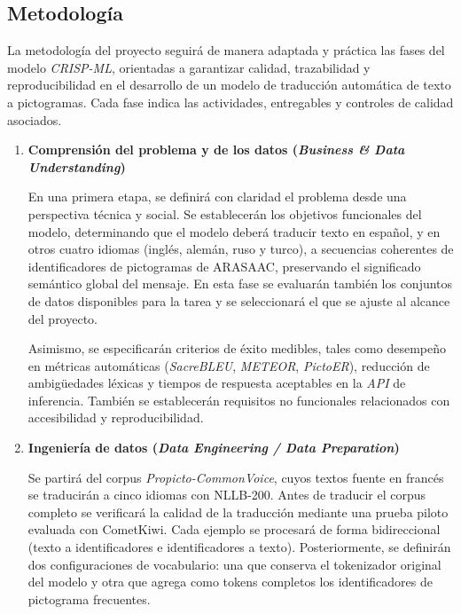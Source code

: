 \subsection{Metodología}

La metodología del proyecto seguirá de manera adaptada y práctica las fases del modelo \textit{CRISP-ML}, orientadas a garantizar calidad, trazabilidad y reproducibilidad en el desarrollo de un modelo de traducción automática de texto a pictogramas. Cada fase indica las actividades, entregables y controles de calidad asociados.

\begin{enumerate}

    \item \textbf{Comprensión del problema y de los datos (\textit{Business \& Data Understanding})}

    En una primera etapa, se definirá con claridad el problema desde una perspectiva técnica y social. Se establecerán los objetivos funcionales del modelo, determinando que el modelo deberá traducir texto en español, y en otros cuatro idiomas (inglés, alemán, ruso y turco), a secuencias coherentes de identificadores de pictogramas de ARASAAC, preservando el significado semántico global del mensaje. En esta fase se evaluarán también los conjuntos de datos disponibles para la tarea y se seleccionará el que se ajuste al alcance del proyecto.

    Asimismo, se especificarán criterios de éxito medibles, tales como desempeño en métricas automáticas (\textit{SacreBLEU}, \textit{METEOR}, \textit{PictoER}), reducción de ambigüedades léxicas y tiempos de respuesta aceptables en la \textit{API} de inferencia. También se establecerán requisitos no funcionales relacionados con accesibilidad y reproducibilidad.

    \item \textbf{Ingeniería de datos (\textit{Data Engineering / Data Preparation})}

    Se partirá del corpus \textit{Propicto-CommonVoice}, cuyos textos fuente en francés se traducirán a cinco idiomas con NLLB-200. Antes de traducir el corpus completo se verificará la calidad de la traducción mediante una prueba piloto evaluada con CometKiwi. Cada ejemplo se procesará de forma bidireccional (texto a identificadores e identificadores a texto). Posteriormente, se definirán dos configuraciones de vocabulario: una que conserva el tokenizador original del modelo y otra que agrega como tokens completos los identificadores de pictograma frecuentes.


\end{enumerate}

